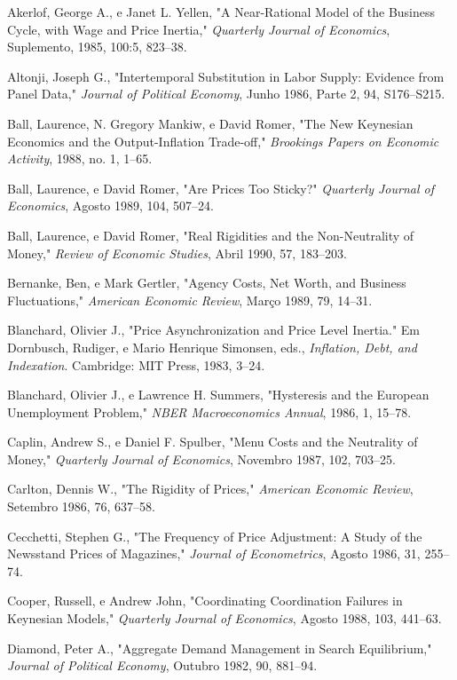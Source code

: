\documentclass[12pt]{article}
\begin{document}
{\begin{description}
\item Akerlof, George A., e Janet L. Yellen, "A Near-Rational Model of the Business Cycle, with Wage and Price Inertia," \textit{Quarterly Journal of Economics}, Suplemento, 1985, 100:5, 823–38.
\item Altonji, Joseph G., "Intertemporal Substitution in Labor Supply: Evidence from Panel Data," \textit{Journal of Political Economy}, Junho 1986, Parte 2, 94, S176–S215.
\item Ball, Laurence, N. Gregory Mankiw, e David Romer, "The New Keynesian Economics and the Output-Inflation Trade-off," \textit{Brookings Papers on Economic Activity}, 1988, no. 1, 1–65.
\item Ball, Laurence, e David Romer, "Are Prices Too Sticky?" \textit{Quarterly Journal of Economics}, Agosto 1989, 104, 507–24.
\item Ball, Laurence, e David Romer, "Real Rigidities and the Non-Neutrality of Money," \textit{Review of Economic Studies}, Abril 1990, 57, 183–203.
\item Bernanke, Ben, e Mark Gertler, "Agency Costs, Net Worth, and Business Fluctuations," \textit{American Economic Review}, Março 1989, 79, 14–31.
\item Blanchard, Olivier J., "Price Asynchronization and Price Level Inertia." Em Dornbusch, Rudiger, e Mario Henrique Simonsen, eds., \textit{Inflation, Debt, and Indexation}. Cambridge: MIT Press, 1983, 3–24.
\item Blanchard, Olivier J., e Lawrence H. Summers, "Hysteresis and the European Unemployment Problem," \textit{NBER Macroeconomics Annual}, 1986, 1, 15–78.
\item Caplin, Andrew S., e Daniel F. Spulber, "Menu Costs and the Neutrality of Money," \textit{Quarterly Journal of Economics}, Novembro 1987, 102, 703–25.
\item Carlton, Dennis W., "The Rigidity of Prices," \textit{American Economic Review}, Setembro 1986, 76, 637–58.
\item Cecchetti, Stephen G., "The Frequency of Price Adjustment: A Study of the Newsstand Prices of Magazines," \textit{Journal of Econometrics}, Agosto 1986, 31, 255–74.
\item Cooper, Russell, e Andrew John, "Coordinating Coordination Failures in Keynesian Models," \textit{Quarterly Journal of Economics}, Agosto 1988, 103, 441–63.
\item Diamond, Peter A., "Aggregate Demand Management in Search Equilibrium," \textit{Journal of Political Economy}, Outubro 1982, 90, 881–94.

\end{description}}
\end{document}
